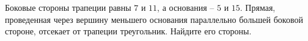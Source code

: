 \begin{ex}
	\begin{condition}
		Боковые стороны трапеции равны \( 7  \) и \( 11 \), а основания – \( 5 \) и \( 15 \). Прямая, проведенная через вершину меньшего основания параллельно большей боковой стороне, отсекает от трапеции треугольник. Найдите его стороны.
	\end{condition}
\end{ex}